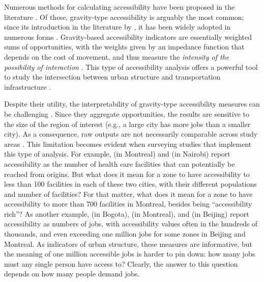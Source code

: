 \documentclass[]{elsarticle} %
\begin{document}
Numerous methods for calculating accessibility have been proposed in the
literature \citep{geurs2004}. Of these, gravity-type accessibility is
arguably the most common; since its introduction in the literature by
\citet{hansen1959}, it has been widely adopted in numerous forms
\citep{cervero_transportation_2002, paez2004network, geurs2004, levinson_accessibility_1998, Arranz2019measuring}.
Gravity-based accessibility indicators are essentially weighted sums of
opportunities, with the weights given by an impedance function that
depends on the cost of movement, and thus measure the \emph{intensity of
the possibility of interaction} \citep{hansen1959}. This type of
accessibility analysis offers a powerful tool to study the intersection
between urban structure and transportation infrastructure
\citep{handy_measuring_1997}.

Despite their utility, the interpretability of gravity-type
accessibility measures can be challenging \citep{geurs2004, miller2018}.
Since they aggregate opportunities, the results are sensitive to the
size of the region of interest (e.g., a large city has more jobs than a
smaller city). As a consequence, raw outputs are not necessarily
comparable across study areas \citep{allen2019}. This limitation becomes
evident when surveying studies that implement this type of analysis. For
example, \citet{paez_healthcare_2010} (in Montreal) and
\citet{campbell_2019_accessibility} (in Nairobi) report accessibility as
the number of health care facilities that can potentially be reached
from origins. But what does it mean for a zone to have accessibility to
less than 100 facilities in each of these two cities, with their
different populations and number of facilities? For that matter, what
does it mean for a zone to have accessibility to more than 700
facilities in Montreal, besides being ``accessibility rich''? As another
example, \citet{bocarejo_s_transport_2012} (in Bogota),
\citet{elgeneidy_cost_2016} (in Montreal), and
\citet{jiang_2016_accessibility} (in Beijing) report accessibility as
numbers of jobs, with accessibility values often in the hundreds of
thousands, and even exceeding one million jobs for some zones in Beijing
and Montreal. As indicators of urban structure, these measures are
informative, but the meaning of one million accessible jobs is harder to
pin down: how many jobs must any single person have access to? Clearly,
the answer to this question depends on how many people demand jobs.
\end{document}
